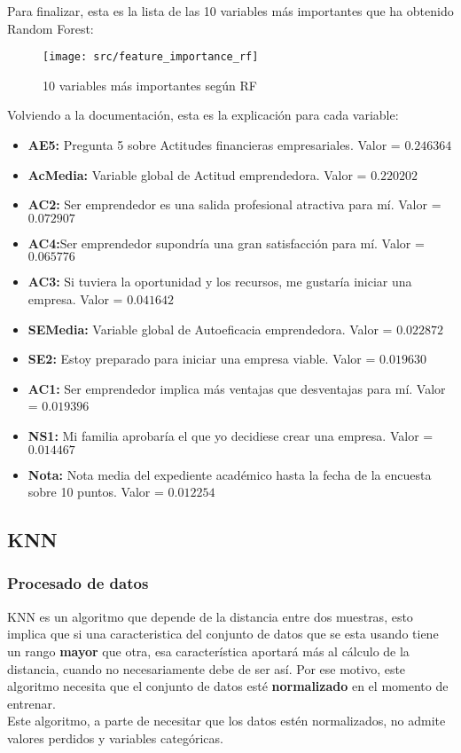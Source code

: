 Para finalizar, esta es la lista de las 10 variables más importantes que ha obtenido Random Forest:
\begin{figure}[H]
	\centering
	\texttt{[image: src/feature\_importance\_rf]}
	\caption{10 variables más importantes según RF}
	\label{fig:feature_rf}
\end{figure}
Volviendo a la documentación, esta es la explicación para cada variable:
\begin{itemize}
	\item\textbf{AE5:} Pregunta 5 sobre Actitudes financieras empresariales. Valor = $0.246364$
	\item\textbf{AcMedia:} Variable global de Actitud emprendedora. Valor = $0.220202$
	\item\textbf{AC2:} Ser emprendedor es una salida profesional atractiva para mí. Valor = $0.072907$
	\item\textbf{AC4:}Ser emprendedor supondría una gran satisfacción para mí. Valor = $0.065776$
	\item\textbf{AC3:} Si tuviera la oportunidad y los recursos, me gustaría iniciar una empresa. Valor = $0.041642$
	\item\textbf{SEMedia:} Variable global de Autoeficacia emprendedora. Valor = $0.022872$
	\item\textbf{SE2:} Estoy preparado para iniciar una empresa viable. Valor = $0.019630$
	\item\textbf{AC1:} Ser emprendedor implica más ventajas que desventajas para mí. Valor = $0.019396$
	\item\textbf{NS1:} Mi familia aprobaría el que yo decidiese crear una empresa. Valor = $0.014467$
	\item\textbf{Nota:} Nota media del expediente académico hasta la fecha de la encuesta sobre 10 puntos. Valor = $0.012254$
\end{itemize}
\subsection{KNN}

\subsubsection*{Procesado de datos}
KNN es un algoritmo que depende de la distancia entre dos muestras, esto implica que si una caracteristica del conjunto de datos que se esta usando tiene un rango \textbf{mayor} que otra, esa característica aportará más al cálculo de la distancia, cuando no necesariamente debe de ser así. Por ese motivo, este algoritmo necesita que el conjunto de datos esté \textbf{normalizado} en el momento de entrenar.\\
\linebreak
Este algoritmo, a parte de necesitar que los datos estén normalizados, no admite valores perdidos y variables categóricas.

